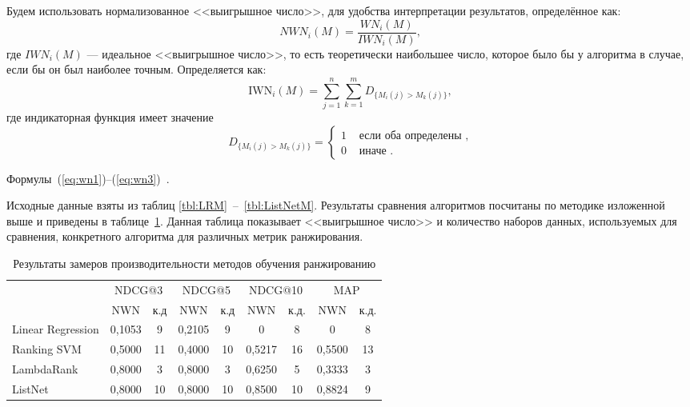 Будем использовать нормализованное <<выигрышное число>>, для удобства интерпретации результатов, определённое как:
\begin{equation}
	\label{eq:wn2}
	NWN_i(M)=\frac{WN_i(M)}{IWN_i(M)},
\end{equation}
где $IWN_i(M)$ --- идеальное <<выигрышное число>>, то есть теоретически наибольшее число, которое было
бы у алгоритма в случае, если бы он был наиболее точным. Определяется как:
\begin{equation}
	\label{eq:wn3}
	\mathrm{IWN}_i(M)=\sum_{j=1}^n \sum_{k=1}^m D_{\{M_i(j)>M_k(j)\}},
\end{equation}
где индикаторная функция имеет значение
\[
D_{\{M_i(j)>M_k(j)\}}= \begin{cases}1 & \text { если оба определены }, \\ 0 & \text { иначе }.\end{cases}
\]

Формулы~(\ref{eq:wn1})--(\ref{eq:wn3})~\cite{cmp}.

Исходные данные взяты из таблиц \ref{tbl:LRM}~--~\ref{tbl:ListNetM}. Результаты сравнения алгоритмов посчитаны по методике изложенной выше и приведены в таблице~\ref{tbl:measure}. Данная таблица показывает <<выигрышное число>> и количество наборов данных, используемых для сравнения, конкретного алгоритма для различных метрик ранжирования.

\begin{table}[h]
	\begin{center}
		\begin{threeparttable}
			\captionsetup{justification=raggedright,singlelinecheck=off}
			\caption{Результаты замеров производительности методов обучения ранжированию}
			\label{tbl:measure}
			\begin{tabular}{|l|c|c|c|c|c|c|c|c|}
				\hline
				\makecell[c]{\multirow{2}{*}{Метод}}  &\multicolumn{2}{c|}{NDCG@3} & \multicolumn{2}{c|}{NDCG@5} & \multicolumn{2}{c|}{NDCG@10} & \multicolumn{2}{c|}{MAP} \\
			    \cline{2-9}  & NWN  & к.д & NWN  & к.д & NWN  & к.д.  & NWN  & к.д. \\\hline
				Linear Regression &	0,1053&	9&	0,2105&	9&	0&	8&	0&	8 \\\hline
				Ranking SVM &0,5000&	11&	0,4000&	10&	0,5217&	16&	0,5500&	13 \\\hline
				LambdaRank & 0,8000&	3&	0,8000&	3&	0,6250&	5&	0,3333&	3 \\\hline
				ListNet  &	0,8000&	10&	0,8000&	10&	0,8500&	10&	0,8824&	9 \\\hline
			\end{tabular}
		\end{threeparttable}
	\end{center}
\end{table}


